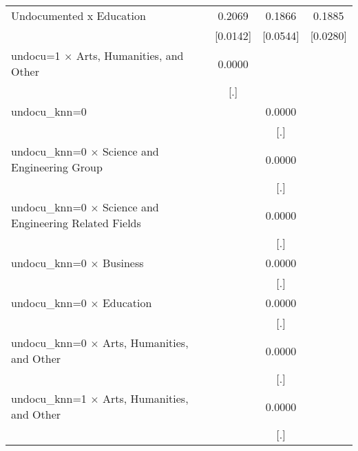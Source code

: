 \begin{table}[htbp]
\begin{tabular}{l*{3}{c}}
\addlinespace
Undocumented x Education&      0.2069\sym{***}&      0.1866\sym{***}&      0.1885\sym{***}\\
                    &    [0.0142]         &    [0.0544]         &    [0.0280]         \\
\addlinespace
undocu=1 $\times$ Arts, Humanities, and Other&      0.0000         &                     &                     \\
                    &         [.]         &                     &                     \\
\addlinespace
undocu\_knn=0        &                     &      0.0000         &                     \\
                    &                     &         [.]         &                     \\
\addlinespace
undocu\_knn=0 $\times$ Science and Engineering Group&                     &      0.0000         &                     \\
                    &                     &         [.]         &                     \\
\addlinespace
undocu\_knn=0 $\times$ Science and Engineering Related Fields&                     &      0.0000         &                     \\
                    &                     &         [.]         &                     \\
\addlinespace
undocu\_knn=0 $\times$ Business&                     &      0.0000         &                     \\
                    &                     &         [.]         &                     \\
\addlinespace
undocu\_knn=0 $\times$ Education&                     &      0.0000         &                     \\
                    &                     &         [.]         &                     \\
\addlinespace
undocu\_knn=0 $\times$ Arts, Humanities, and Other&                     &      0.0000         &                     \\
                    &                     &         [.]         &                     \\
\addlinespace
undocu\_knn=1 $\times$ Arts, Humanities, and Other&                     &      0.0000         &                     \\
                    &                     &         [.]         &                     \\

\end{tabular}
\end{table}
